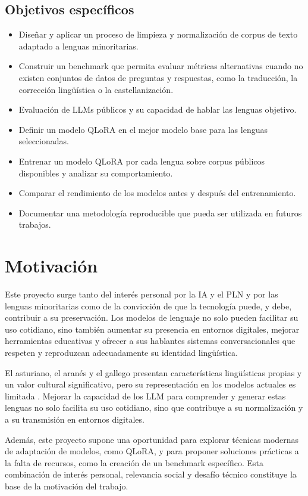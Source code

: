 \subsection{Objetivos específicos}
\begin{itemize}
    \item Diseñar y aplicar un proceso de limpieza y normalización de corpus de texto adaptado a lenguas minoritarias.
    \item Construir un benchmark que permita evaluar métricas alternativas cuando no existen conjuntos de datos de preguntas y respuestas, como la traducción, la corrección lingüística o la castellanización.
    \item Evaluación de LLMs públicos y su capacidad de hablar las lenguas objetivo.
    \item Definir un modelo QLoRA en el mejor modelo base para las lenguas seleccionadas.
    \item Entrenar un modelo QLoRA por cada lengua sobre corpus públicos disponibles y analizar su comportamiento.
    \item Comparar el rendimiento de los modelos antes y después del entrenamiento.
    \item Documentar una metodología reproducible que pueda ser utilizada en futuros trabajos.
\end{itemize}


\section{Motivación}
Este proyecto surge tanto del interés personal por la IA y el PLN y por las lenguas minoritarias como de la convicción de que la tecnología puede, y debe, contribuir a su preservación. Los modelos de lenguaje no solo pueden facilitar su uso cotidiano, sino también aumentar su presencia en entornos digitales, mejorar herramientas educativas y ofrecer a sus hablantes sistemas conversacionales que respeten y reproduzcan adecuadamente su identidad lingüística.

El asturiano, el aranés y el gallego presentan características lingüísticas propias y un valor cultural significativo, pero su representación en los modelos actuales es limitada \cite{Sobocinska_2022}. Mejorar la capacidad de los LLM para comprender y generar estas lenguas no solo facilita su uso cotidiano, sino que contribuye a su normalización y a su transmisión en entornos digitales.

Además, este proyecto supone una oportunidad para explorar técnicas modernas de adaptación de modelos, como QLoRA, y para proponer soluciones prácticas a la falta de recursos, como la creación de un benchmark específico. Esta combinación de interés personal, relevancia social y desafío técnico constituye la base de la motivación del trabajo.


